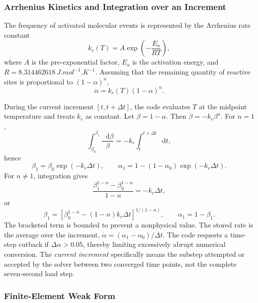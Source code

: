 \documentclass[oneside,openany]{amsdtx}
\newcommand{\dd}{\mathop{}\!\mathrm{d}}
\begin{document}
\subsubsection{Arrhenius Kinetics and Integration over an Increment}

The frequency of activated molecular events is represented by the Arrhenius
rate constant
\begin{equation}
  k_r(T)=A\exp\left(-\frac{E_a}{R T}\right),
  \label{eq:arrhenius}
\end{equation}
where \(A\) is the pre-exponential factor, \(E_a\) is the activation energy,
and \(R=\SI{8.314462618}{J.mol^{-1}.K^{-1}}\). Assuming that the remaining
quantity of reactive sites is proportional to \((1-\alpha)^n\),
\begin{equation}
  \boxed{\dot\alpha=k_r(T)(1-\alpha)^n.}
  \label{eq:kinetic-law}
\end{equation}

During the current increment \([t,t+\Delta t]\), the code evaluates \(T\) at
the midpoint temperature and treats \(k_r\) as constant. Let
\(\beta=1-\alpha\). Then \(\dot\beta=-k_r\beta^n\). For \(n=1\),
\begin{equation}
  \int_{\beta_0}^{\beta_1}\frac{\dd\beta}{\beta}
  =-k_r\int_t^{t+\Delta t}\dd t,
\end{equation}
hence
\begin{equation}
  \beta_1=\beta_0\exp(-k_r\Delta t),\qquad
  \boxed{\alpha_1=1-(1-\alpha_0)\exp(-k_r\Delta t).}
  \label{eq:analytic-n1}
\end{equation}
For \(n\ne1\), integration gives
\begin{equation}
  \frac{\beta_1^{1-n}-\beta_0^{1-n}}{1-n}=-k_r\Delta t,
\end{equation}
or
\begin{equation}
  \boxed{\beta_1=
  \left[\beta_0^{1-n}-(1-n)k_r\Delta t\right]^{1/(1-n)},
  \qquad\alpha_1=1-\beta_1.}
  \label{eq:analytic-n}
\end{equation}
The bracketed term is bounded to prevent a nonphysical value. The stored rate
is the average over the increment,
\(\dot\alpha=(\alpha_1-\alpha_0)/\Delta t\). The code requests a time-step
cutback if \(\Delta\alpha>0{.}05\), thereby limiting excessively abrupt
numerical conversion. The \emph{current increment} specifically means the
substep attempted or accepted by the solver between two converged time points,
not the complete seven-second load step.

\subsubsection{Finite-Element Weak Form}
\end{document}
